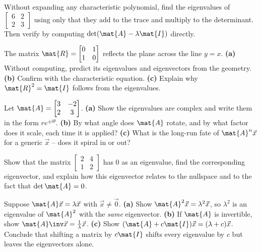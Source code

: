 \begin{exercise}
\label{ch23:ex-tracedet-only}
Without expanding any characteristic polynomial, find the eigenvalues of
$\begin{bmatrix}6 & 2\\ 2 & 3\end{bmatrix}$ using only that they add to the trace
and multiply to the determinant. Then verify by computing
$\det(\mat{A}-\lambda\mat{I})$ directly.
\end{exercise}

\begin{exercise}
\label{ch23:ex-reflect}
The matrix $\mat{R}=\begin{bmatrix}0 & 1\\ 1 & 0\end{bmatrix}$ reflects the plane
across the line $y=x$. \textbf{(a)} Without computing, predict its eigenvalues and
eigenvectors from the geometry. \textbf{(b)} Confirm with the characteristic
equation. \textbf{(c)} Explain why $\mat{R}^2=\mat{I}$ follows from the eigenvalues.
\end{exercise}

\begin{exercise}
\label{ch23:ex-rot}
Let $\mat{A}=\begin{bmatrix}3 & -2\\ 2 & 3\end{bmatrix}$. \textbf{(a)} Show the
eigenvalues are complex and write them in the form $r e^{\pm i\theta}$. \textbf{(b)}
By what angle does $\mat{A}$ rotate, and by what factor does it scale, each time it
is applied? \textbf{(c)} What is the long-run fate of $\mat{A}^n\vec{x}$ for a
generic $\vec{x}$ -- does it spiral in or out?
\end{exercise}

\begin{exercise}[Singular means $\lambda=0$]
\label{ch23:ex-singular}
Show that the matrix $\begin{bmatrix}2 & 4\\ 1 & 2\end{bmatrix}$ has $0$ as an
eigenvalue, find the corresponding eigenvector, and explain how this eigenvector
relates to the nullspace and to the fact that $\det\mat{A}=0$.
\end{exercise}

\begin{exercise}
\label{ch23:ex-powers}
Suppose $\mat{A}\vec{x}=\lambda\vec{x}$ with $\vec{x}\neq\vec{0}$. \textbf{(a)} Show
$\mat{A}^2\vec{x}=\lambda^2\vec{x}$, so $\lambda^2$ is an eigenvalue of
$\mat{A}^2$ with the \emph{same} eigenvector. \textbf{(b)} If $\mat{A}$ is
invertible, show $\mat{A}\inv\vec{x}=\tfrac{1}{\lambda}\vec{x}$. \textbf{(c)}
Show $(\mat{A}+c\mat{I})\vec{x}=(\lambda+c)\vec{x}$. Conclude that shifting a matrix
by $c\mat{I}$ shifts every eigenvalue by $c$ but leaves the eigenvectors alone.
\end{exercise}

